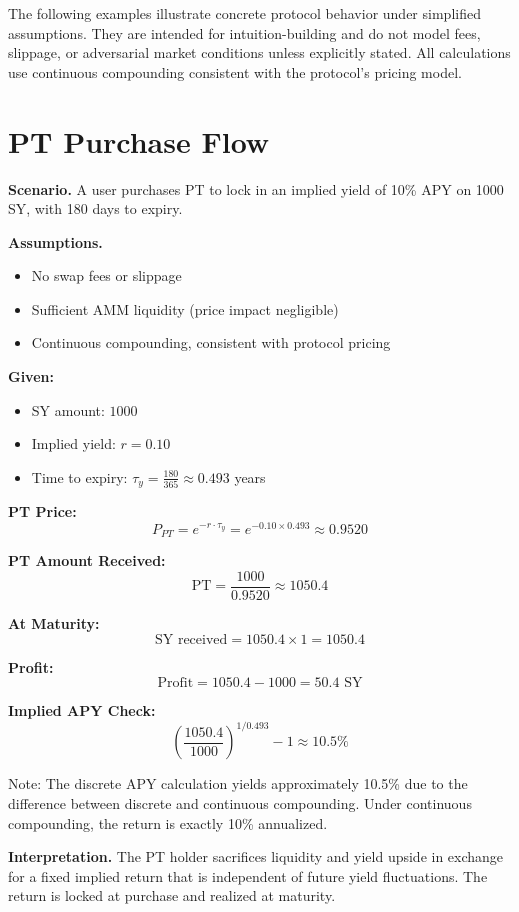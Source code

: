 
The following examples illustrate concrete protocol behavior under simplified assumptions. They are intended for intuition-building and do not model fees, slippage, or adversarial market conditions unless explicitly stated. All calculations use continuous compounding consistent with the protocol's pricing model.


\section{PT Purchase Flow}

\textbf{Scenario.}
A user purchases PT to lock in an implied yield of 10\% APY on 1000 SY, with 180 days to expiry.

\textbf{Assumptions.}
\begin{itemize}
\item No swap fees or slippage
\item Sufficient AMM liquidity (price impact negligible)
\item Continuous compounding, consistent with protocol pricing
\end{itemize}

\textbf{Given:}
\begin{itemize}
\item SY amount: $1000$
\item Implied yield: $r = 0.10$
\item Time to expiry: $\tau_y = \frac{180}{365} \approx 0.493$ years
\end{itemize}

\textbf{PT Price:}
\[
P_{PT} = e^{-r \cdot \tau_y} = e^{-0.10 \times 0.493} \approx 0.9520
\]

\textbf{PT Amount Received:}
\[
\text{PT} = \frac{1000}{0.9520} \approx 1050.4
\]

\textbf{At Maturity:}
\[
\text{SY received} = 1050.4 \times 1 = 1050.4
\]

\textbf{Profit:}
\[
\text{Profit} = 1050.4 - 1000 = 50.4 \text{ SY}
\]

\textbf{Implied APY Check:}
\[
\left(\frac{1050.4}{1000}\right)^{1 / 0.493} - 1 \approx 10.5\%
\]

Note: The discrete APY calculation yields approximately 10.5\% due to the difference between discrete and continuous compounding. Under continuous compounding, the return is exactly 10\% annualized.

\textbf{Interpretation.}
The PT holder sacrifices liquidity and yield upside in exchange for a fixed implied return that is independent of future yield fluctuations. The return is locked at purchase and realized at maturity.


